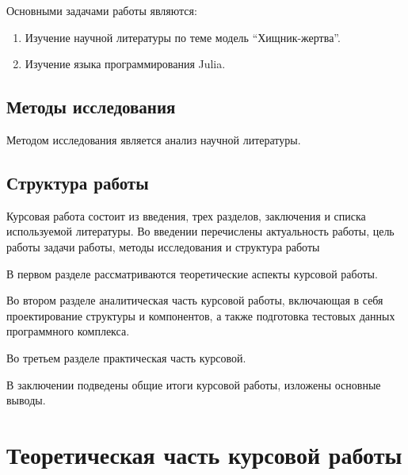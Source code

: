 \documentclass[
  13pt,
  fontsize=13pt,
  russian,
  a4paper,
,captions=tableheading
]{scrreprt}
\providecommand{\tightlist}{%
  \setlength{\itemsep}{0pt}\setlength{\parskip}{0pt}}
\begin{document}
Основными задачами работы являются:

\begin{enumerate}
\def\labelenumi{\arabic{enumi}.}
\tightlist
\item
  Изучение научной литературы по теме модель ``Хищник-жертва''.
\item
  Изучение языка программирования Julia.
\end{enumerate}

\hypertarget{ux43cux435ux442ux43eux434ux44b-ux438ux441ux441ux43bux435ux434ux43eux432ux430ux43dux438ux44f}{%
\section*{Методы
исследования}\label{ux43cux435ux442ux43eux434ux44b-ux438ux441ux441ux43bux435ux434ux43eux432ux430ux43dux438ux44f}}

Методом исследования является анализ научной литературы.

\hypertarget{ux441ux442ux440ux443ux43aux442ux443ux440ux430-ux440ux430ux431ux43eux442ux44b}{%
\section*{Структура
работы}\label{ux441ux442ux440ux443ux43aux442ux443ux440ux430-ux440ux430ux431ux43eux442ux44b}}

Курсовая работа состоит из введения, трех разделов, заключения и списка
используемой литературы. Во введении перечислены актуальность работы,
цель работы задачи работы, методы исследования и структура работы

В первом разделе рассматриваются теоретические аспекты курсовой работы.

Во втором разделе аналитическая часть курсовой работы, включающая в себя
проектирование структуры и компонентов, а также подготовка тестовых
данных программного комплекса.

Во третьем разделе практическая часть курсовой.

В заключении подведены общие итоги курсовой работы, изложены основные
выводы.

\hypertarget{ux442ux435ux43eux440ux435ux442ux438ux447ux435ux441ux43aux430ux44f-ux447ux430ux441ux442ux44c-ux43aux443ux440ux441ux43eux432ux43eux439-ux440ux430ux431ux43eux442ux44b}{%
\chapter{Теоретическая часть курсовой
работы}\label{ux442ux435ux43eux440ux435ux442ux438ux447ux435ux441ux43aux430ux44f-ux447ux430ux441ux442ux44c-ux43aux443ux440ux441ux43eux432ux43eux439-ux440ux430ux431ux43eux442ux44b}}
\end{document}
